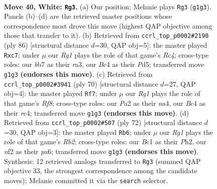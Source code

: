 \documentclass[11pt]{article}
\begin{document}
\clearpage

\begin{figure}[p]\centering
\begin{subfigure}{0.46\textwidth}\centering
\resizebox{\linewidth}{!}{%
\newchessgame
\chessboard[
  setfen={4r3/pb1p4/5k2/8/2B5/8/PPK2n2/2B3R1 w - - 0 40},
  showmover=false,
  pgfstyle=straightmove, color=movearrow, markmove={g1-g3}
]}
\caption{}
\end{subfigure}\hfill
\begin{subfigure}{0.46\textwidth}\centering
\resizebox{\linewidth}{!}{%
\newchessgame
\chessboard[
  setfen={8/2p2p1k/7P/3P4/2R5/r2n2KP/6B1/8 w - - 1 44},
  showmover=false,
  pgfstyle=straightmove, color=movearrow, markmove={c4-c7}
]}
\caption{}
\end{subfigure}
\\[4pt]
\begin{subfigure}{0.46\textwidth}\centering
\resizebox{\linewidth}{!}{%
\newchessgame
\chessboard[
  setfen={5R2/6p1/6p1/4k3/n1r5/6P1/7P/6BK w - - 0 36},
  showmover=false,
  pgfstyle=straightmove, color=movearrow, markmove={f8-f7}
]}
\caption{}
\end{subfigure}\hfill
\begin{subfigure}{0.46\textwidth}\centering
\resizebox{\linewidth}{!}{%
\newchessgame
\chessboard[
  setfen={8/8/p6p/2r1kbp1/8/P4B2/1R4PP/6K1 w - - 1 37},
  showmover=false,
  pgfstyle=straightmove, color=movearrow, markmove={b2-b6}
]}
\caption{}
\end{subfigure}
\caption{\textbf{Move 40, White: \texttt{Rg3}.} (a) Our position; Melanie plays \texttt{Rg3} (\texttt{g1g3}). Panels (b)--(d) are the retrieved master positions whose correspondence most drove this move (highest QAP objective among those that transfer to it). (b) Retrieved from \texttt{ccrl\_top\_p0002\#2190} (ply 86) [structural distance $d$=30, QAP obj=5]: the master played \texttt{Rxc7}; under $\mu$ our \emph{Rg1} plays the role of that game's \emph{Rc4}; cross-type roles: our \emph{b}b7 as their \emph{r}a3, our \emph{B}c4 as their \emph{P}d5; transferred move \texttt{g1g3} \textbf{(endorses this move)}. (c) Retrieved from \texttt{ccrl\_top\_p0002\#3941} (ply 70) [structural distance $d$=27, QAP obj=4]: the master played \texttt{Rf7}; under $\mu$ our \emph{Rg1} plays the role of that game's \emph{Rf8}; cross-type roles: our \emph{P}a2 as their \emph{n}a4, our \emph{B}c4 as their \emph{r}c4; transferred move \texttt{g1g3} \textbf{(endorses this move)}. (d) Retrieved from \texttt{ccrl\_top\_p0002\#507} (ply 72) [structural distance $d$=30, QAP obj=3]: the master played \texttt{Rb6}; under $\mu$ our \emph{Rg1} plays the role of that game's \emph{Rb2}; cross-type roles: our \emph{B}c1 as their \emph{P}h2, our \emph{n}f2 as their \emph{p}a6; transferred move \texttt{g1g3} \textbf{(endorses this move)}. Synthesis: 12 retrieved analogs transferred to \texttt{Rg3} (summed QAP objective 33, the strongest correspondence among the candidate moves); Melanie committed it via the \texttt{search} selector.}
\label{fig:thought-m78}
\end{figure}
\end{document}
